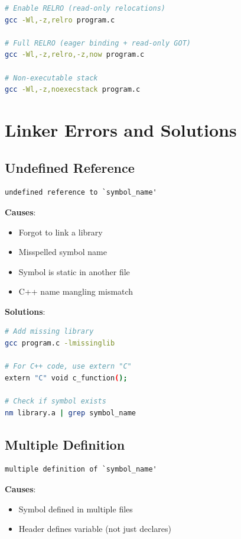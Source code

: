 \begin{lstlisting}[language=bash]
# Enable RELRO (read-only relocations)
gcc -Wl,-z,relro program.c

# Full RELRO (eager binding + read-only GOT)
gcc -Wl,-z,relro,-z,now program.c

# Non-executable stack
gcc -Wl,-z,noexecstack program.c
\end{lstlisting}

\section{Linker Errors and Solutions}

\subsection{Undefined Reference}

\begin{verbatim}
undefined reference to `symbol_name'
\end{verbatim}

\textbf{Causes}:
\begin{itemize}
    \item Forgot to link a library
    \item Misspelled symbol name
    \item Symbol is static in another file
    \item C++ name mangling mismatch
\end{itemize}

\textbf{Solutions}:
\begin{lstlisting}[language=bash]
# Add missing library
gcc program.c -lmissinglib

# For C++ code, use extern "C"
extern "C" void c_function();

# Check if symbol exists
nm library.a | grep symbol_name
\end{lstlisting}

\subsection{Multiple Definition}

\begin{verbatim}
multiple definition of `symbol_name'
\end{verbatim}

\textbf{Causes}:
\begin{itemize}
    \item Symbol defined in multiple files
    \item Header defines variable (not just declares)
\end{itemize}

